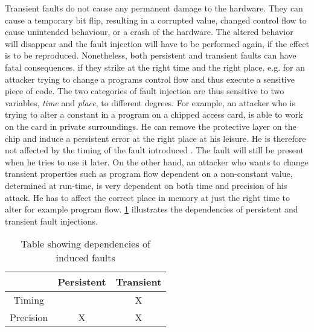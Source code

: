 Transient faults do not cause any permanent damage to the hardware. They can cause a temporary bit flip, resulting in a corrupted value, changed control flow to cause unintended behaviour, or a crash of the hardware. The altered behavior will disappear and the fault injection will have to be performed again, if the effect is to be reproduced.
Nonetheless, both persistent and transient faults can have fatal consequences, if they strike at the right time and the right place, e.g. for an attacker trying to change a programs control flow and thus execute a sensitive piece of code. The two categories of fault injection are thus sensitive to two variables, \textit{time} and \textit{place}, to different degrees. For example, an attacker who is trying to alter a constant in a program on a chipped access card, is able to work on the card in private surroundings. He can remove the protective layer on the chip and induce a persistent error at the right place at his leisure. He is therefore not affected by the timing of the fault introduced . The fault will still be present when he tries to use it later. On the other hand, an attacker who wants to change transient properties such as program flow dependent on a non-constant value, determined at run-time, is very dependent on both time and precision of his attack. He has to affect the correct place in memory at just the right time to alter for example program flow. \cref{tab:dependencies} illustrates the dependencies of persistent and transient fault injections.

\begin{table}[h!]
\centering
\begin{tabular}{|c|c|c|}
\hline  & Persistent & Transient \\ 
\hline Timing &  & X \\ 
\hline Precision & X & X \\ 
\hline 
\end{tabular} 
\caption{Table showing dependencies of induced faults}
\label{tab:dependencies}
\end{table}

